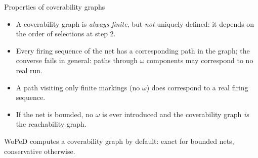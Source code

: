 \begin{notebox}{Properties of coverability graphs}
\begin{itemize}
  \item A coverability graph is \emph{always finite}, but \emph{not} uniquely defined: it depends on the order of selections at step 2.
  \item Every firing sequence of the net has a corresponding path in the graph; the converse fails in general: paths through $\omega$ components may correspond to no real run.
  \item A path visiting only finite markings (no $\omega$) does correspond to a real firing sequence.
  \item If the net is bounded, no $\omega$ is ever introduced and the coverability graph \emph{is} the reachability graph.
\end{itemize}
WoPeD computes a coverability graph by default: exact for bounded nets, conservative otherwise.
\end{notebox}


